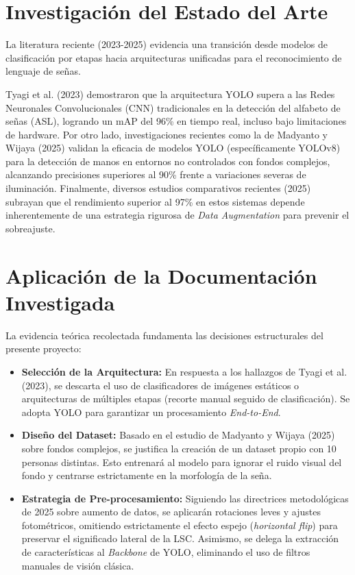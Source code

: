 \documentclass[12pt,letterpaper]{article}
\begin{document}
\section{Investigación del Estado del Arte}
La literatura reciente (2023-2025) evidencia una transición desde modelos de clasificación por etapas hacia arquitecturas unificadas para el reconocimiento de lenguaje de señas. 

Tyagi et al. (2023) demostraron que la arquitectura YOLO supera a las Redes Neuronales Convolucionales (CNN) tradicionales en la detección del alfabeto de señas (ASL), logrando un mAP del 96\% en tiempo real, incluso bajo limitaciones de hardware. Por otro lado, investigaciones recientes como la de Madyanto y Wijaya (2025) validan la eficacia de modelos YOLO (específicamente YOLOv8) para la detección de manos en entornos no controlados con fondos complejos, alcanzando precisiones superiores al 90\% frente a variaciones severas de iluminación. Finalmente, diversos estudios comparativos recientes (2025) subrayan que el rendimiento superior al 97\% en estos sistemas depende inherentemente de una estrategia rigurosa de \textit{Data Augmentation} para prevenir el sobreajuste.

\section{Aplicación de la Documentación Investigada}
La evidencia teórica recolectada fundamenta las decisiones estructurales del presente proyecto:
\begin{itemize}[leftmargin=*]
    \item \textbf{Selección de la Arquitectura:} En respuesta a los hallazgos de Tyagi et al. (2023), se descarta el uso de clasificadores de imágenes estáticos o arquitecturas de múltiples etapas (recorte manual seguido de clasificación). Se adopta YOLO para garantizar un procesamiento \textit{End-to-End}.
    \item \textbf{Diseño del Dataset:} Basado en el estudio de Madyanto y Wijaya (2025) sobre fondos complejos, se justifica la creación de un dataset propio con 10 personas distintas. Esto entrenará al modelo para ignorar el ruido visual del fondo y centrarse estrictamente en la morfología de la seña.
    \item \textbf{Estrategia de Pre-procesamiento:} Siguiendo las directrices metodológicas de 2025 sobre aumento de datos, se aplicarán rotaciones leves y ajustes fotométricos, omitiendo estrictamente el efecto espejo (\textit{horizontal flip}) para preservar el significado lateral de la LSC. Asimismo, se delega la extracción de características al \textit{Backbone} de YOLO, eliminando el uso de filtros manuales de visión clásica.
\end{itemize}
\end{document}
